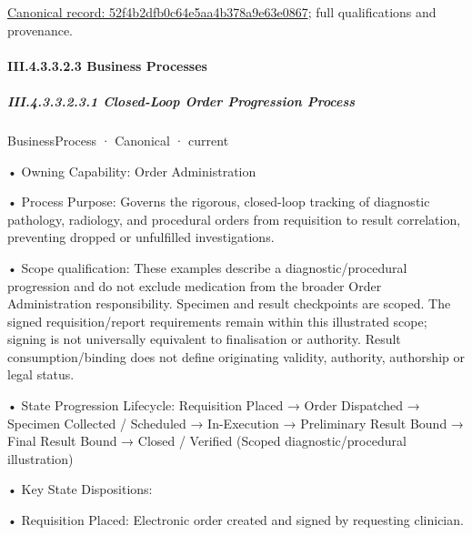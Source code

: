 {\footnotesize \href{../../../../../../../../continuum/business/business-function/52f4b2dfb0c64e5aa4b378a9e63e0867.md}{Canonical record: 52f4b2dfb0c64e5aa4b378a9e63e0867}; full qualifications and provenance.}\par
\paragraph*{III.4.3.3.2.3 Business Processes}
\label{navigation:III.4.3.3.2.3}

\subparagraph*{III.4.3.3.2.3.1 Closed-Loop Order Progression Process}
\label{navigation:III.4.3.3.2.3.1}

\label{element:e19a7c9594a4401e92450e4c31598982}
{\small BusinessProcess · Canonical · current}\par

•
Owning Capability: Order Administration



•
Process Purpose: Governs the rigorous, closed-loop tracking of diagnostic pathology, radiology, and procedural orders from requisition to result correlation, preventing dropped or unfulfilled investigations.



•
Scope qualification: These examples describe a diagnostic/procedural progression and do not exclude medication from the broader Order Administration responsibility. Specimen and result checkpoints are scoped. The signed requisition/report requirements remain within this illustrated scope; signing is not universally equivalent to finalisation or authority. Result consumption/binding does not define originating validity, authority, authorship or legal status.



•
State Progression Lifecycle: Requisition Placed → Order Dispatched → Specimen Collected / Scheduled → In-Execution → Preliminary Result Bound → Final Result Bound → Closed / Verified   (Scoped diagnostic/procedural illustration)



•
Key State Dispositions:



•
Requisition Placed: Electronic order created and signed by requesting clinician.



